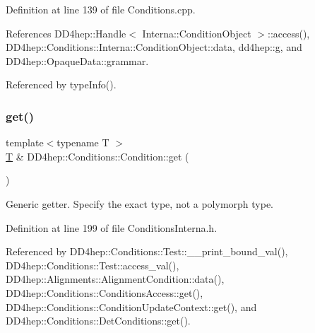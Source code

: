 Definition at line 139 of file Conditions.\+cpp.



References D\+D4hep\+::\+Handle$<$ Interna\+::\+Condition\+Object $>$\+::access(), D\+D4hep\+::\+Conditions\+::\+Interna\+::\+Condition\+Object\+::data, dd4hep\+::g, and D\+D4hep\+::\+Opaque\+Data\+::grammar.



Referenced by type\+Info().

\hypertarget{class_d_d4hep_1_1_conditions_1_1_condition_a3c80bbcbf2b9e5b3c3105309aacf2308}{}\label{class_d_d4hep_1_1_conditions_1_1_condition_a3c80bbcbf2b9e5b3c3105309aacf2308} 
\subsubsection{\texorpdfstring{get()}{get()}\hspace{0.1cm}{\footnotesize\ttfamily [1/2]}}
{\footnotesize\ttfamily template$<$typename T $>$ \\
\hyperlink{class_t}{T} \& D\+D4hep\+::\+Conditions\+::\+Condition\+::get (\begin{DoxyParamCaption}{ }\end{DoxyParamCaption})}



Generic getter. Specify the exact type, not a polymorph type. 



Definition at line 199 of file Conditions\+Interna.\+h.



Referenced by D\+D4hep\+::\+Conditions\+::\+Test\+::\+\_\+\+\_\+print\+\_\+bound\+\_\+val(), D\+D4hep\+::\+Conditions\+::\+Test\+::access\+\_\+val(), D\+D4hep\+::\+Alignments\+::\+Alignment\+Condition\+::data(), D\+D4hep\+::\+Conditions\+::\+Conditions\+Access\+::get(), D\+D4hep\+::\+Conditions\+::\+Condition\+Update\+Context\+::get(), and D\+D4hep\+::\+Conditions\+::\+Det\+Conditions\+::get().

\hypertarget{class_d_d4hep_1_1_conditions_1_1_condition_af346e01c6a0073f16a392f67088c260c}{}\label{class_d_d4hep_1_1_conditions_1_1_condition_af346e01c6a0073f16a392f67088c260c} 
